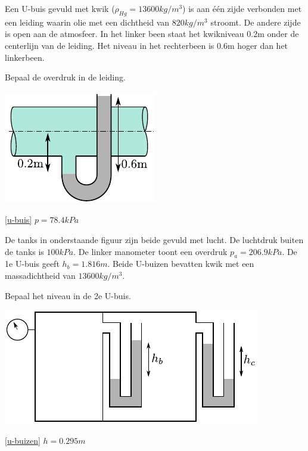 	\begin{toepassing}
		\label{u-buis}
Een U-buis gevuld met kwik ($\rho_{Hg}=13600\unit{kg/m^3}$) is aan één zijde verbonden met een leiding waarin olie met een dichtheid van $820\unit{kg/m^3}$ stroomt. De andere zijde is open aan de atmosfeer. In het linker been staat het kwikniveau 0.2m onder de centerlijn van de leiding. Het niveau in het rechterbeen is 0.6m hoger dan het linkerbeen.
		
Bepaal de overdruk in de leiding.

\centering
\includegraphics{fig/hydrostatica/u-buis}
	\end{toepassing}
	\begin{antwoord}{\ref{u-buis}}
		$p = 78.4\unit{kPa}$
	\end{antwoord}
	\begin{toepassing}
		\label{u-buizen}
De tanks in onderstaande figuur zijn beide gevuld met lucht. De luchtdruk buiten de tanks is $100\unit{kPa}$. De linker manometer toont een overdruk $p_a=206.9\unit{kPa}$. De 1e U-buis geeft $h_b=1.816\unit{m}$. Beide U-buizen bevatten kwik met een massadichtheid van $13600kg/m^3$.
		
Bepaal het niveau in de 2e U-buis.

\centering
\includegraphics{fig/hydrostatica/u-buizen}
	\end{toepassing}
	\begin{antwoord}{\ref{u-buizen}}
		$h = 0.295\unit{m}$
	\end{antwoord}
